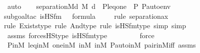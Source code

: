 \begin{isabellebody}
\ auto\isanewline
\isanewline
\ \ \isamarkupfalse%
\ {\isachardoublequoteopen}separation{\isacharparenleft}{\kern0pt}{\isacharhash}{\kern0pt}{\isacharhash}{\kern0pt}M{\isacharcomma}{\kern0pt}{\isasymlambda}d{\isachardot}{\kern0pt}\ {\isacharparenleft}{\kern0pt}M{\isacharcomma}{\kern0pt}\ {\isacharbrackleft}{\kern0pt}d{\isacharbrackright}{\kern0pt}\ {\isacharat}{\kern0pt}\ {\isacharbrackleft}{\kern0pt}P{\isacharcomma}{\kern0pt}leq{\isacharcomma}{\kern0pt}one{\isacharcomma}{\kern0pt}{\isasymlangle}{\isasymF}{\isacharcomma}{\kern0pt}\ {\isasymG}{\isacharcomma}{\kern0pt}\ P{\isacharcomma}{\kern0pt}\ P{\isacharunderscore}{\kern0pt}auto{\isasymrangle}{\isacharbrackright}{\kern0pt}{\isacharat}{\kern0pt}env\ {\isasymTurnstile}\ {\isacharquery}{\kern0pt}{\isasympsi}{\isacharparenright}{\kern0pt}{\isacharparenright}{\kern0pt}{\isachardoublequoteclose}\isanewline
\ \ \ \ \isamarkupfalse%
{\isacharparenleft}{\kern0pt}subgoal{\isacharunderscore}{\kern0pt}tac\ {\isachardoublequoteopen}is{\isacharunderscore}{\kern0pt}HS{\isacharunderscore}{\kern0pt}fm{\isacharparenleft}{\kern0pt}{}{\isacharcomma}{\kern0pt}\ {}{\isacharparenright}{\kern0pt}\ {\isasymin}\ formula{\isachardoublequoteclose}{\isacharparenright}{\kern0pt}\isanewline
\ \ \ \ \isamarkupfalse%
{\isacharparenleft}{\kern0pt}rule\ separation{\isacharunderscore}{\kern0pt}ax{\isacharparenright}{\kern0pt}\isanewline
\ \ \ \ \isamarkupfalse%
{\isacharparenleft}{\kern0pt}rule\ Exists{\isacharunderscore}{\kern0pt}type{\isacharcomma}{\kern0pt}\ rule\ And{\isacharunderscore}{\kern0pt}type{\isacharcomma}{\kern0pt}\ rule\ is{\isacharunderscore}{\kern0pt}HS{\isacharunderscore}{\kern0pt}fm{\isacharunderscore}{\kern0pt}type{\isacharcomma}{\kern0pt}\ simp{\isacharcomma}{\kern0pt}\ simp{\isacharparenright}{\kern0pt}\isanewline
\ \ \ \ \isamarkupfalse%
\ assms\ forcesHS{\isacharunderscore}{\kern0pt}type\ is{\isacharunderscore}{\kern0pt}HS{\isacharunderscore}{\kern0pt}fm{\isacharunderscore}{\kern0pt}type\ \isanewline
\ \ \ \ \ \ \isamarkupfalse%
\ force\isanewline
\ \ \ \ \isamarkupfalse%
\ P{\isacharunderscore}{\kern0pt}in{\isacharunderscore}{\kern0pt}M\ leq{\isacharunderscore}{\kern0pt}in{\isacharunderscore}{\kern0pt}M\ one{\isacharunderscore}{\kern0pt}in{\isacharunderscore}{\kern0pt}M\ {\isasymF}{\isacharunderscore}{\kern0pt}in{\isacharunderscore}{\kern0pt}M\ {\isasymG}{\isacharunderscore}{\kern0pt}in{\isacharunderscore}{\kern0pt}M\ P{\isacharunderscore}{\kern0pt}auto{\isacharunderscore}{\kern0pt}in{\isacharunderscore}{\kern0pt}M\ pair{\isacharunderscore}{\kern0pt}in{\isacharunderscore}{\kern0pt}M{\isacharunderscore}{\kern0pt}iff\ assms\isanewline

\end{isabellebody}
